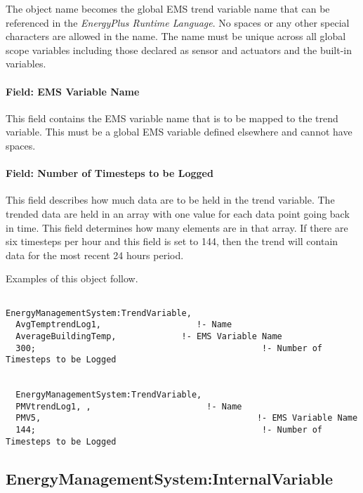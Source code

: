 The object name becomes the global EMS trend variable name that can be referenced in the \emph{EnergyPlus Runtime Language}. No spaces or any other special characters are allowed in the name. The name must be unique across all global scope variables including those declared as sensor and actuators and the built-in variables.

\paragraph{Field: EMS Variable Name}\label{field-ems-variable-name-2}

This field contains the EMS variable name that is to be mapped to the trend variable. This must be a global EMS variable defined elsewhere and cannot have spaces.

\paragraph{Field: Number of Timesteps to be Logged}\label{field-number-of-timesteps-to-be-logged}

This field describes how much data are to be held in the trend variable. The trended data are held in an array with one value for each data point going back in time. This field determines how many elements are in that array. If there are six timesteps per hour and this field is set to 144, then the trend will contain data for the most recent 24 hours period.

Examples of this object follow.

\begin{lstlisting}

EnergyManagementSystem:TrendVariable,
  AvgTemptrendLog1,                   !- Name
  AverageBuildingTemp,             !- EMS Variable Name
  300;                                             !- Number of Timesteps to be Logged


  EnergyManagementSystem:TrendVariable,
  PMVtrendLog1, ,                       !- Name
  PMV5,                                           !- EMS Variable Name
  144;                                             !- Number of Timesteps to be Logged
\end{lstlisting}

\subsection{EnergyManagementSystem:InternalVariable}\label{energymanagementsysteminternalvariable}

